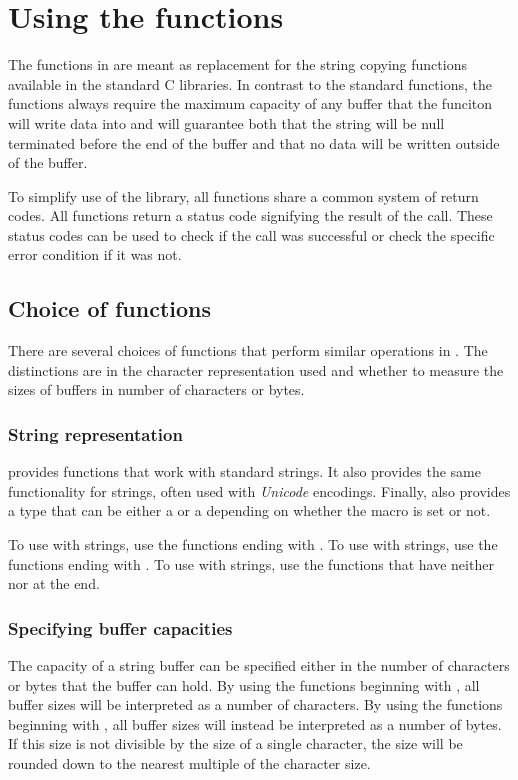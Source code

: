 \section{Using the \strsafe{} functions}
The functions in \strsafe{} are meant as replacement for
the string copying functions available in the standard C libraries.
In contrast to the standard functions,
the functions always require the maximum capacity of any buffer
that the funciton will write data into
and will guarantee both
that the string will be null terminated before the end of the buffer
and that no data will be written outside of the buffer.

To simplify use of the library,
all functions share a common system of return codes.
All functions return a status code signifying the result of the call.
These status codes can be used to check if the call was successful
or check the specific error condition if it was not.

\subsection{Choice of functions}
There are several choices of functions
that perform similar operations in \strsafe{}.
The distinctions are in the character representation used
and whether to measure the sizes of buffers
in number of characters or bytes.

\subsubsection{String representation}
\strsafe{} provides functions that work with standard  strings.
It also provides the same functionality for  strings,
often used with \emph{Unicode} encodings.
Finally, \strsafe{} also provides a  type that can be either a
 or a  depending on
whether the macro  is set or not.

To use \strsafe{} with  strings,
use the functions ending with .
To use \strsafe{} with  strings,
use the functions ending with .
To use \strsafe{} with  strings,
use the functions that have neither  nor  at the end.

\subsubsection{Specifying buffer capacities}
The capacity of a string buffer can be specified either in the number of
characters or bytes that the buffer can hold.
By using the functions beginning with ,
all buffer sizes will be interpreted as a number of characters.
By using the functions beginning with ,
all buffer sizes will instead be interpreted as a number of bytes.
If this size is not divisible by the size of a single character,
the size will be rounded down to the nearest multiple of the character size.

